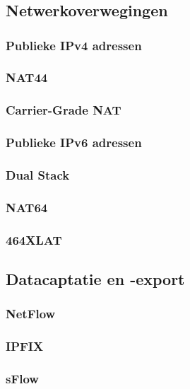\chapter{}%
\label{ch:stand-van-zaken}



\section{Netwerkoverwegingen}
\subsection{Publieke IPv4 adressen}

\subsection{NAT44}

\subsection{Carrier-Grade NAT}

\subsection{Publieke IPv6 adressen}

\subsection{Dual Stack}

\subsection{NAT64}

\subsection{464XLAT}

\section{Datacaptatie en -export}
\subsection{NetFlow}

\subsection{IPFIX}

\subsection{sFlow}
